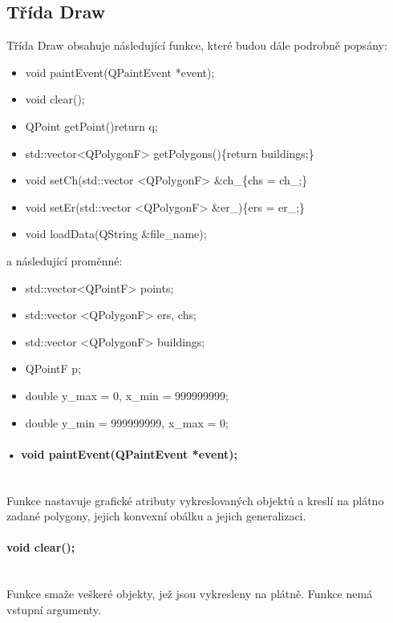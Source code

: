 \documentclass[11pt]{article}
\begin{document}
	 	
	 	\subsection{Třída Draw}
	 	Třída Draw obsahuje následující funkce, které budou dále podrobně popsány:
	 	
	 	\begin{itemize}
	 		\item void paintEvent(QPaintEvent *event);
	 		\item void clear();
	 		\item QPoint getPoint(){return q;}
	 		\item std::vector<QPolygonF> getPolygons()\{return buildings;\}
	 		\item void setCh(std::vector <QPolygonF> \&ch\_\{chs = ch\_;\}
	 		\item void setEr(std::vector <QPolygonF> \&er\_)\{ers = er\_;\}
	 		\item void loadData(QString \&file\_name);
	 	\end{itemize}
	 	
	 	a následující proměnné:
	 	
	 	\begin{itemize}
	 		\item std::vector<QPointF> points;
	 		\item std::vector <QPolygonF> ers, chs;
	 		\item std::vector <QPolygonF> buildings;
	 		\item QPointF p;
	 		\item double y\_max = 0, x\_min = 999999999;
	 		\item double y\_min = 999999999, x\_max = 0;
	 	\end{itemize}
	 	
	 	\paragraph{•	void paintEvent(QPaintEvent *event);}\mbox{}\\
	 	Funkce nastavuje grafické atributy vykreslovaných objektů a kreslí na plátno zadané polygony, jejich konvexní obálku a jejich generalizaci. 
	 	
	 	\paragraph{void clear();}\mbox{}\\
	 	Funkce smaže veškeré objekty, jež jsou vykresleny na plátně. Funkce nemá vstupní argumenty. 
	 	
\end{document}
